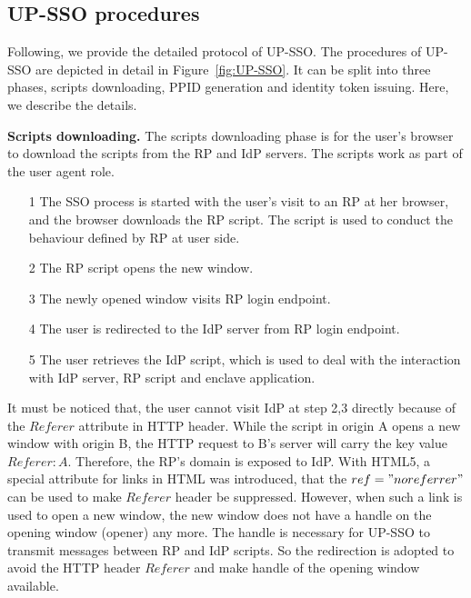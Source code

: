 \subsection{UP-SSO procedures}
Following, we provide the detailed protocol of UP-SSO.
The procedures of UP-SSO are depicted in detail in Figure~\ref{fig:UP-SSO}. It can be split into three phases, scripts downloading, PPID generation and identity token issuing. Here, we describe the details. 

\vspace{3mm}\noindent\textbf{Scripts downloading.} The scripts downloading phase is for the user’s browser to download the scripts from the RP and IdP servers. The scripts work as part of the user agent role.
\begin{itemize}
\item[1]The SSO process is started with the user's visit to an RP at her browser, and the browser downloads the RP script. The script is used to conduct the behaviour defined by RP at user side.
\item[2]The RP script opens the new window. 
\item[3]The newly opened window visits RP login endpoint.
\item[4]The user is redirected to the IdP server from RP login endpoint.
\item[5]The user retrieves the IdP script, which is used to deal with the interaction with IdP server, RP script and enclave application.
\end{itemize}
It must be noticed that, the user cannot visit IdP at step 2,3 directly because of the $Referer$ attribute in HTTP header. While the script in origin A opens a new window with origin B, the HTTP request to B's server will carry the key value $Referer: A$. Therefore, the RP's domain is exposed to IdP. With HTML5, a special attribute for links in HTML was introduced, that the $ref="noreferrer"$ can be used to make $Referer$ header be suppressed. However, when such a link is used to open a new window, the new window does not have a handle on the opening window (opener) any more. The handle is necessary for UP-SSO to transmit messages between RP and IdP scripts. So the redirection is adopted to avoid the HTTP header $Referer$ and make handle of the opening window available. 


